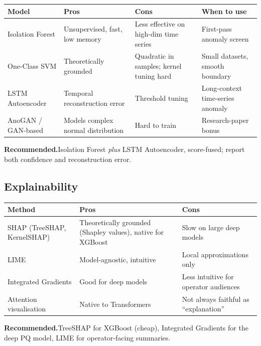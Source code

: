 \documentclass[11pt,a4paper]{article}
\begin{document}
\begin{table}[H]
\centering
\small
\begin{tabular}{p{2.8cm}p{4.2cm}p{4.4cm}p{3.0cm}}
\toprule
\textbf{Model} & \textbf{Pros} & \textbf{Cons} & \textbf{When to use} \\
\midrule
Isolation Forest & Unsupervised, fast, low memory & Less effective on
high-dim time series & First-pass anomaly screen \\
One-Class SVM & Theoretically grounded & Quadratic in samples; kernel
tuning hard & Small datasets, smooth boundary \\
LSTM Autoencoder & Temporal reconstruction error & Threshold tuning &
Long-context time-series anomaly \\
AnoGAN / GAN-based & Models complex normal distribution & Hard to train
& Research-paper bonus \\
\bottomrule
\end{tabular}
\end{table}

\textbf{Recommended.}\enspace Isolation Forest \emph{plus} LSTM
Autoencoder, score-fused; report both confidence and reconstruction error.

\subsection{Explainability}

\begin{table}[H]
\centering
\small
\begin{tabular}{p{2.8cm}p{5.4cm}p{6.0cm}}
\toprule
\textbf{Method} & \textbf{Pros} & \textbf{Cons} \\
\midrule
SHAP (TreeSHAP, KernelSHAP) & Theoretically grounded (Shapley values),
native for XGBoost & Slow on large deep models \\
LIME & Model-agnostic, intuitive & Local approximations only \\
Integrated Gradients & Good for deep models & Less intuitive for
operator audiences \\
Attention visualisation & Native to Transformers & Not always faithful
as ``explanation'' \\
\bottomrule
\end{tabular}
\end{table}

\textbf{Recommended.}\enspace TreeSHAP for XGBoost (cheap), Integrated
Gradients for the deep PQ model, LIME for operator-facing summaries.
\end{document}
